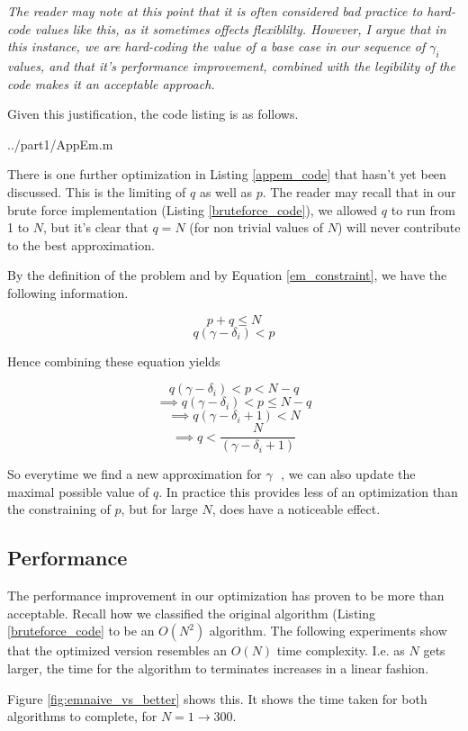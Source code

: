 \documentclass[10pt]{article}
\newcommand*{\gam}{$\gamma \text{ }$}
\newcommand*{\gami}{$\gamma_{i} \text{ }$}
\begin{document}
\emph{The reader may note at this point that it is often considered bad practice to hard-code values like this, as it sometimes offects flexiblilty. However, I argue that in this instance, we are hard-coding the value of a base case in our sequence of \gami values, and that it's performance improvement, combined with the legibility of the code makes it an acceptable approach.}

Given this justification, the code listing is as follows.

   {../part1/AppEm.m}

There is one further optimization in Listing \ref{appem_code} that hasn't yet been discussed. This is the limiting of $q$ as well as $p$. The reader may recall that in our brute force implementation (Listing \ref{bruteforce_code}), we allowed $q$ to run from 1 to $N$, but it's clear that $q = N$ (for non trivial values of $N$) will never contribute to the best approximation.

By the definition of the problem and by Equation \ref{em_constraint}, we have the following information.

$$ p + q \leq N $$
$$ q (\gamma - \delta_i) < p $$

Hence combining these equation yields

$$ q (\gamma - \delta_i) < p < N - q $$ 
$$ \implies  q (\gamma - \delta_i) < p \leq N - q $$ 
$$ \implies q (\gamma - \delta_i + 1) < N  $$ 
$$ \implies q  < \frac{N}{(\gamma - \delta_i + 1)}  $$ 

So everytime we find a new approximation for \gam, we can also update the maximal possible value of $q$. In practice this provides less of an optimization than the constraining of $p$, but for large $N$, does have a noticeable effect.

\subsection{Performance}

The performance improvement in our optimization has proven to be more than acceptable. Recall how we classified the original algorithm (Listing \ref{bruteforce_code} to be an $O(N^2)$ algorithm. The following experiments show that the optimized version resembles an $O(N)$ time complexity. I.e. as $N$ gets larger, the time for the algorithm to terminates increases in a linear fashion.

Figure \ref{fig:emnaive_vs_better} shows this. It shows the time taken for both algorithms to complete, for $N = 1 \rightarrow 300$.
\end{document}
